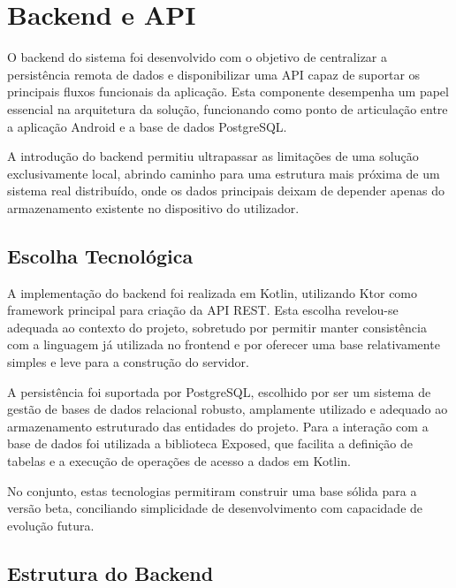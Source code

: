 %
%
\chapter{Backend e API} \label{cap:backend}

O backend do sistema foi desenvolvido com o objetivo de centralizar a persistência remota de dados e disponibilizar uma API
capaz de suportar os principais fluxos funcionais da aplicação.
Esta componente desempenha um papel essencial na arquitetura da solução, funcionando como ponto de articulação entre a
aplicação Android e a base de dados PostgreSQL.

A introdução do backend permitiu ultrapassar as limitações de uma solução exclusivamente local, abrindo caminho para
uma estrutura mais próxima de um sistema real distribuído, onde os dados principais deixam de depender apenas do armazenamento
existente no dispositivo do utilizador.

\section{Escolha Tecnológica}

A implementação do backend foi realizada em Kotlin, utilizando Ktor como framework principal para criação da API REST.
Esta escolha revelou-se adequada ao contexto do projeto, sobretudo por permitir manter consistência com a linguagem
já utilizada no frontend e por oferecer uma base relativamente simples e leve para a construção do servidor.

A persistência foi suportada por PostgreSQL, escolhido por ser um sistema de gestão de bases de dados relacional robusto,
amplamente utilizado e adequado ao armazenamento estruturado das entidades do projeto.
Para a interação com a base de dados foi utilizada a biblioteca Exposed, que facilita a definição de tabelas e a execução
de operações de acesso a dados em Kotlin.

No conjunto, estas tecnologias permitiram construir uma base sólida para a versão beta, conciliando simplicidade de desenvolvimento
com capacidade de evolução futura.

\section{Estrutura do Backend}

